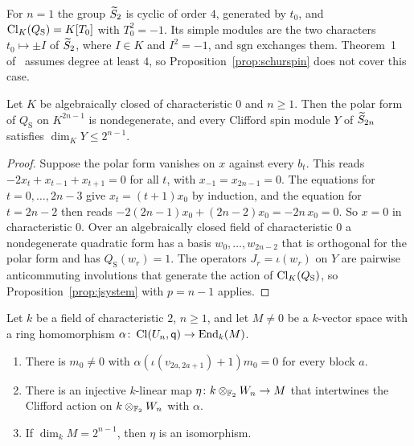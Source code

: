 For $n=1$ the group $\widetilde{S}_2$ is cyclic of order $4$, generated by $t_0$, and $\operatorname{Cl}_K(Q_{\mathrm S})=K[T_0]$ with $T_0^2=-1$. Its simple modules are the two characters $t_0\mapsto\pm I$ of $\widetilde{S}_2$, where $I\in K$ and $I^2=-1$, and $\mathrm{sgn}$ exchanges them. Theorem~1 of~\cite{Maas10} assumes degree at least $4$, so Proposition~\ref{prop:schurspin} does not cover this case.

\begin{theorem}\label{thm:char0}
Let $K$ be algebraically closed of characteristic $0$ and $n\ge1$. Then the polar form of $Q_{\mathrm S}$ on $K^{2n-1}$ is nondegenerate, and every Clifford spin module $Y$ of $\widetilde{S}_{2n}$ satisfies $\dim_{K}Y\le2^{n-1}$.
\end{theorem}

\begin{proof}
Suppose the polar form vanishes on $x$ against every $b_t$. This reads $-2x_t+x_{t-1}+x_{t+1}=0$ for all $t$, with $x_{-1}=x_{2n-1}=0$. The equations for $t=0,\dots,2n-3$ give $x_t=(t+1)x_0$ by induction, and the equation for $t=2n-2$ then reads $-2(2n-1)x_0+(2n-2)x_0=-2n\,x_0=0$. So $x=0$ in characteristic $0$. Over an algebraically closed field of characteristic $0$ a nondegenerate quadratic form has a basis $w_0,\dots,w_{2n-2}$ that is orthogonal for the polar form and has $Q_{\mathrm S}(w_r)=1$. The operators $J_r=\iota(w_r)$ on $Y$ are pairwise anticommuting involutions that generate the action of $\operatorname{Cl}_K(Q_{\mathrm S})$, so Proposition~\ref{prop:jsystem} with $p=n-1$ applies.
\end{proof}

\begin{theorem}\label{thm:vacuum}
Let $k$ be a field of characteristic $2$, $n\ge1$, and let $M\ne0$ be a $k$-vector space with a ring homomorphism $\alpha\colon\operatorname{Cl}(U_n,\mathsf{q})\to\operatorname{End}_k(M)$.
\begin{enumerate}
\item There is $m_0\ne0$ with $\alpha(\iota(v_{2a,2a+1})+1)m_0=0$ for every block $a$.
\item There is an injective $k$-linear map $\eta\colon k\otimes_{\mathbb{F}_2}W_n\to M$ that intertwines the Clifford action on $k\otimes_{\mathbb{F}_2}W_n$ with $\alpha$.
\item If $\dim_{k}M=2^{n-1}$, then $\eta$ is an isomorphism.
\end{enumerate}
\end{theorem}

